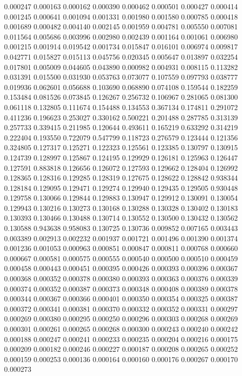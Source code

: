 0.000247
0.000163
0.000162
0.000390
0.000462
0.000501
0.000427
0.000414
0.001245
0.000641
0.001094
0.001331
0.001980
0.001580
0.000785
0.000418
0.001689
0.000482
0.004140
0.002145
0.001959
0.004781
0.005550
0.007081
0.011564
0.005686
0.003996
0.002980
0.002439
0.001164
0.001061
0.006980
0.001215
0.001914
0.019542
0.001734
0.015847
0.016101
0.006974
0.009817
0.042771
0.015827
0.015113
0.045756
0.020345
0.005647
0.013897
0.032254
0.017801
0.005009
0.044605
0.043890
0.000982
0.004931
0.008115
0.113282
0.031391
0.015500
0.031930
0.053763
0.073077
0.107559
0.097793
0.038777
0.019936
0.062601
0.056688
0.103690
0.068890
0.074108
0.159544
0.182259
0.153484
0.081526
0.073845
0.126267
0.256732
0.106967
0.281065
0.081300
0.061118
0.132805
0.111674
0.154488
0.134553
0.367134
0.174811
0.291072
0.411236
0.196623
0.253027
0.330162
0.500221
0.201488
0.287785
0.313139
0.257733
0.339415
0.211985
0.120644
0.493611
0.165219
0.633292
0.314219
0.222404
0.193550
0.722079
0.547799
0.118723
0.276579
0.123444
0.121356
0.324805
0.127317
0.125271
0.122323
0.125561
0.123385
0.130797
0.130915
0.124739
0.128997
0.125867
0.124195
0.129929
0.126181
0.125963
0.126447
0.127591
0.883818
0.126656
0.126072
0.127593
0.129662
0.128404
0.126992
0.128365
0.128316
0.129285
0.128319
0.127675
0.128622
0.128842
0.938344
0.128184
0.129095
0.129471
0.129274
0.129940
0.129435
0.129505
0.930448
0.129758
0.130066
0.129844
0.129883
0.130947
0.129912
0.130091
0.130054
0.129943
0.130216
0.130273
0.130168
0.130288
0.130328
0.130402
0.130183
0.130393
0.130466
0.130488
0.130714
0.130552
0.130500
0.130432
0.130562
0.130588
0.943638
0.958083
0.130725
0.130736
0.009852
0.007165
0.003443
0.003389
0.002913
0.002232
0.001937
0.001721
0.001496
0.001390
0.001374
0.001236
0.001053
0.000963
0.000851
0.000847
0.000811
0.000768
0.000660
0.000667
0.000581
0.000575
0.000555
0.000540
0.000500
0.000510
0.000459
0.000458
0.000443
0.000451
0.000395
0.000426
0.000393
0.000396
0.000367
0.000368
0.000352
0.000378
0.000380
0.000393
0.000363
0.000376
0.000339
0.000374
0.000352
0.000387
0.000373
0.000348
0.000408
0.000389
0.000378
0.000344
0.000367
0.000366
0.000401
0.000350
0.000354
0.000325
0.000387
0.000372
0.000341
0.000381
0.000370
0.000332
0.000352
0.000331
0.000297
0.000269
0.000380
0.000295
0.000250
0.000296
0.000303
0.000268
0.000269
0.000301
0.000261
0.000265
0.000268
0.000300
0.000243
0.000240
0.000242
0.000188
0.000247
0.000241
0.000233
0.000235
0.000204
0.000216
0.000175
0.000209
0.000182
0.000246
0.000227
0.000187
0.000208
0.000265
0.000252
0.000159
0.000253
0.000136
0.000164
0.000160
0.000176
0.000267
0.000170
0.000273
